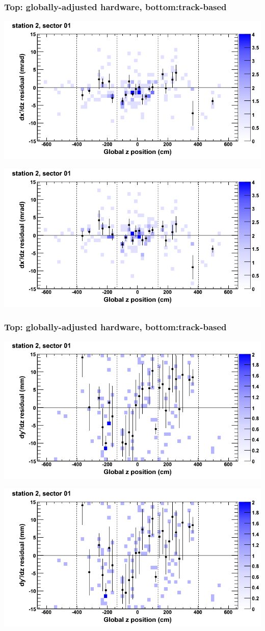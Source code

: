 \documentclass[compress]{beamer}
\begin{document}
\begin{frame}
\frametitle{Top: globally-adjusted hardware, bottom:track-based}
\includegraphics[width=0.7\linewidth]{NOV4_mapplots_HW/DTvsz_st2sec01_dxdz.png}

\includegraphics[width=0.7\linewidth]{NOV4_mapplots/DTvsz_st2sec01_dxdz.png}
\end{frame}

\begin{frame}
\frametitle{Top: globally-adjusted hardware, bottom:track-based}
\includegraphics[width=0.7\linewidth]{NOV4_mapplots_HW/DTvsz_st2sec01_dydz.png}

\includegraphics[width=0.7\linewidth]{NOV4_mapplots/DTvsz_st2sec01_dydz.png}
\end{frame}
\end{document}
